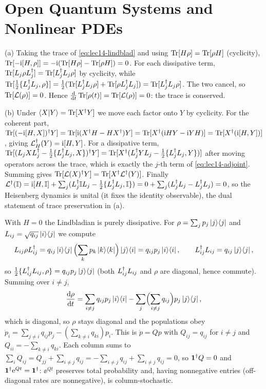 \chapter{Open Quantum Systems and Nonlinear PDEs}

\begin{solution}
(a) Taking the trace of \eqref{eq:lec14-lindblad} and using $\operatorname{Tr}[H\rho]=\operatorname{Tr}[\rho H]$ (cyclicity),
$\operatorname{Tr}[-\mathrm{i}[H,\rho]]=-\mathrm{i}(\operatorname{Tr}[H\rho]-\operatorname{Tr}[\rho H])=0$. For each dissipative term,
$\operatorname{Tr}[L_j\rho L_j^{\dagger}]=\operatorname{Tr}[L_j^{\dagger} L_j\rho]$ by cyclicity, while
$\operatorname{Tr}[\tfrac12\{L_j^{\dagger} L_j,\rho\}]=\tfrac12(\operatorname{Tr}[L_j^{\dagger} L_j\rho]+\operatorname{Tr}[\rho L_j^{\dagger} L_j])
=\operatorname{Tr}[L_j^{\dagger} L_j\rho]$. The two cancel, so $\operatorname{Tr}[\mathcal L(\rho)]=0$. Hence
$\tfrac{\mathrm{d}}{\mathrm{d} t}\operatorname{Tr}[\rho(t)]=\operatorname{Tr}[\mathcal L(\rho)]=0$: the trace is conserved.

(b) Under $\braket{X|Y}=\operatorname{Tr}[X^{\dagger} Y]$ we move each factor onto $Y$ by cyclicity. For the coherent
part, $\operatorname{Tr}[(-\mathrm{i}[H,X])^{\dagger} Y]=\operatorname{Tr}[\mathrm{i}(X^{\dagger} H-H X^{\dagger})Y]=\operatorname{Tr}[X^{\dagger}(\mathrm{i} H Y-\mathrm{i} Y H)]
=\operatorname{Tr}[X^{\dagger}(\mathrm{i}[H,Y])]$, giving $\mathcal L_H^{\dagger}(Y)=\mathrm{i}[H,Y]$. For a dissipative term,
$\operatorname{Tr}[(L_j X L_j^{\dagger}-\tfrac12\{L_j^{\dagger} L_j,X\})^{\dagger} Y]=\operatorname{Tr}[X^{\dagger}(L_j^{\dagger} Y L_j-\tfrac12\{L_j^{\dagger} L_j,Y\})]$
after moving operators across the trace, which is exactly the $j$-th term of
\eqref{eq:lec14-adjoint}. Summing gives $\operatorname{Tr}[\mathcal L(X)^{\dagger} Y]=\operatorname{Tr}[X^{\dagger}\mathcal L^{\dagger}(Y)]$.
Finally $\mathcal L^{\dagger}(\mathbb{I})=\mathrm{i}[H,\mathbb{I}]+\sum_j(L_j^{\dagger}\mathbb{I} L_j-\tfrac12\{L_j^{\dagger} L_j,\mathbb{I}\})
=0+\sum_j(L_j^{\dagger} L_j-L_j^{\dagger} L_j)=0$, so the Heisenberg dynamics is unital (it fixes the identity
observable), the dual statement of trace preservation in (a).
\end{solution}

\begin{solution}
With $H=0$ the Lindbladian is purely dissipative. For $\rho=\sum_j p_j\ket{j}\!\bra{j}$ and
$L_{ij}=\sqrt{q_{ij}}\ket i\!\bra j$ we compute
\[
  L_{ij}\rho L_{ij}^{\dagger}=q_{ij}\ket i\!\bra j\Bigl(\sum_k p_k\ket{k}\!\bra{k}\Bigr)\ket j\!\bra i
    =q_{ij}p_j\ket{i}\!\bra{i},\qquad
  L_{ij}^{\dagger} L_{ij}=q_{ij}\ket{j}\!\bra{j},
\]
so $\tfrac12\{L_{ij}^{\dagger} L_{ij},\rho\}=q_{ij}p_j\ket{j}\!\bra{j}$ (both $L_{ij}^{\dagger} L_{ij}$ and $\rho$ are
diagonal, hence commute). Summing over $i\ne j$,
\[
  \frac{\mathrm{d}\rho}{\mathrm{d} t}=\sum_{i\ne j}q_{ij}p_j\ket{i}\!\bra{i}-\sum_{j}\Bigl(\sum_{i\ne j}q_{ij}\Bigr)p_j
  \ket{j}\!\bra{j},
\]
which is diagonal, so $\rho$ stays diagonal and the populations obey
$\dot p_i=\sum_{j\ne i}q_{ij}p_j-(\sum_{k\ne i}q_{ki})p_i$. This is $\dot p=Qp$ with $Q_{ij}=q_{ij}$
for $i\ne j$ and $Q_{ii}=-\sum_{k\ne i}q_{ki}$. Each column sums to
$\sum_i Q_{ij}=Q_{jj}+\sum_{i\ne j}q_{ij}=-\sum_{i\ne j}q_{ij}+\sum_{i\ne j}q_{ij}=0$, so
$\mathbf 1^{\dagger} Q=0$ and $\mathbf 1^{\dagger}\mathrm{e}^{Qt}=\mathbf1^{\dagger}$: $\ee^{Qt}$ preserves total probability
and, having nonnegative entries (off-diagonal rates are nonnegative), is column-stochastic.
\end{solution}

